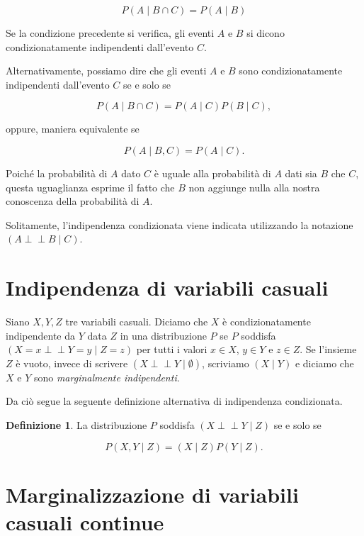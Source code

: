 \documentclass[
  11pt,
]{krantz}
\newcommand{\indep}{\perp \!\!\! \perp}
\theoremstyle{definition}
\newtheorem{definition}{Definizione}[chapter]
\theoremstyle{definition}
\theoremstyle{definition}
\theoremstyle{definition}
\theoremstyle{remark}
\begin{document}
\begin{equation}
P(A \mid B \cap C) = P(A \mid B)
\end{equation}

Se la condizione precedente si verifica, gli eventi \(A\) e \(B\) si dicono condizionatamente indipendenti dall'evento \(C\).

Alternativamente, possiamo dire che gli eventi \(A\) e \(B\) sono condizionatamente indipendenti dall'evento \(C\) se e solo se

\begin{equation}
P(A \mid B \cap C) = P(A \mid C) P(B \mid C),
\end{equation}

oppure, maniera equivalente se

\[
P(A \mid B, C)= P(A \mid C).
\]

Poiché la probabilità di \(A\) dato \(C\) è uguale alla probabilità di \(A\) dati sia \(B\) che \(C\), questa uguaglianza esprime il fatto che \(B\) non aggiunge nulla alla nostra conoscenza della probabilità di \(A\).

Solitamente, l'indipendenza condizionata viene indicata utilizzando la notazione \((A \indep B \mid C)\).

\hypertarget{indipendenza-di-variabili-casuali}{%
\section{Indipendenza di variabili casuali}\label{indipendenza-di-variabili-casuali}}

Siano \(X, Y, Z\) tre variabili casuali. Diciamo che \(X\) è condizionatamente indipendente da \(Y\) data \(Z\) in una distribuzione \(P\) se \(P\) soddisfa \((X=x \indep Y=y \mid Z=z)\) per tutti i valori \(x \in X\), \(y \in Y\) e \(z \in Z\). Se l'insieme \(Z\) è vuoto, invece di scrivere \((X \indep Y \mid \emptyset)\), scriviamo \((X \mid Y)\) e diciamo che \(X\) e \(Y\) sono \emph{marginalmente indipendenti}.

Da ciò segue la seguente definizione alternativa di indipendenza condizionata.

\begin{definition}
La distribuzione \(P\) soddisfa \((X \indep Y \mid Z)\) se e solo se

\[
P(X, Y \mid Z) = (X \mid Z)P(Y \mid Z).
\]
\end{definition}

\hypertarget{sec:margin-vc-cont}{%
\section{Marginalizzazione di variabili casuali continue}\label{sec:margin-vc-cont}}
\end{document}
